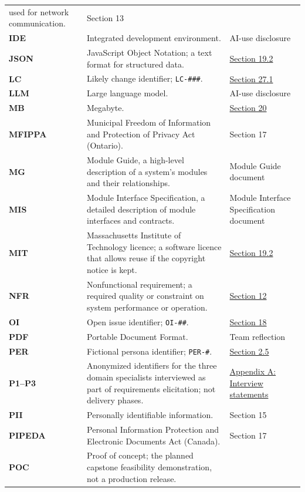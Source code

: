 \documentclass[12pt]{article}
\renewcommand{\_}{\textunderscore\allowbreak}%
\begin{document}
{\begin{longtable}{@{}>{\raggedright\arraybackslash}p{}>{\raggedright\arraybackslash}p{}>{\raggedright\arraybackslash}p{}@{}}
used for network communication. & Section 13\\
\textbf{IDE} & Integrated development environment. & AI-use disclosure\\
\textbf{JSON} & JavaScript Object Notation; a text format for structured data. &
\hyperref[sec:ots-components]{Section 19.2}\\
\textbf{LC} & Likely change identifier; \texttt{LC-\#\#\#}. &
\hyperref[sec:changes]{Section 27.1}\\
\textbf{LLM} & Large language model. & AI-use disclosure\\
\textbf{MB} & Megabyte. & \hyperref[sec:new-problems]{Section 20}\\
\textbf{MFIPPA} & Municipal Freedom of Information and Protection of Privacy
Act (Ontario).
& Section 17\\
\textbf{MG} & Module Guide, a high-level description of a system's modules and
their relationships. & Module Guide document\\
\textbf{MIS} & Module Interface Specification, a detailed description of module
interfaces and contracts. & Module Interface Specification document\\
\textbf{MIT} & Massachusetts Institute of Technology licence; a software licence
that allows reuse if the copyright notice is kept. &
\hyperref[sec:ots-components]{Section 19.2}\\
\textbf{NFR} & Nonfunctional requirement; a required quality or constraint on
system performance or operation. & \hyperref[sec:performance]{Section 12}\\
\textbf{OI} & Open issue identifier; \texttt{OI-\#\#}. &
\hyperref[sec:open-issues]{Section 18}\\
\textbf{PDF} & Portable Document Format. & Team reflection\\
\textbf{PER} & Fictional persona identifier; \texttt{PER-\#}. &
\hyperref[sec:stakeholders]{Section 2.5}\\
\textbf{P1--P3} & Anonymized identifiers for the three domain specialists
interviewed as part of requirements elicitation; not delivery phases. &
\hyperref[sec:src-interview]{Appendix A: Interview statements}\\
\textbf{PII} & Personally identifiable information. & Section 15\\
\textbf{PIPEDA} & Personal Information Protection and Electronic Documents Act
(Canada). & Section 17\\
\textbf{POC} & Proof of concept; the planned capstone feasibility
demonstration, not a production release. &

\end{longtable}}
\end{document}
